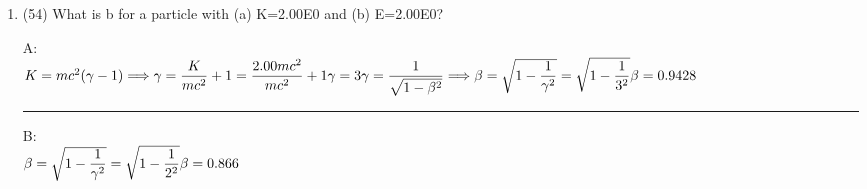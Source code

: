 \documentclass[fleqn]{article}
\begin{document}
\begin{enumerate}
    \item (54) What is b for a particle with (a) K=2.00E0 and (b) E=2.00E0?

      \textcolor{hwColor}{
        A: \\
        $
          K=mc^2(\gamma -1) \Longrightarrow \gamma=\dfrac{K}{mc^2}+1=\dfrac{2.00 mc^2}{mc^2}+1 \\
          \\
          \gamma=3 \\
          \\
          \gamma=\dfrac{1}{\sqrt{1-\beta^2}} \Longrightarrow \beta=\sqrt{1-\dfrac{1}{\gamma^2}}=\sqrt{1-\dfrac{1}{3^2}} \\
          \beta=0.9428
        $
      }

      \textcolor{hwColor}{   
        \rule{15cm}{0.4pt}   
      }

      \textcolor{hwColor}{
        B: \\
        $
        \beta=\sqrt{1-\dfrac{1}{\gamma^2}}=\sqrt{1-\dfrac{1}{2^2}} \\
        \beta=0.866
        $
      }

  \end{enumerate}
\end{document}
